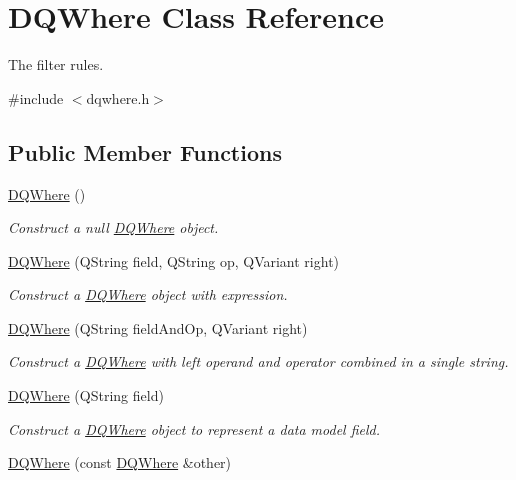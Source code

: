 \hypertarget{classDQWhere}{
\section{DQWhere Class Reference}
\label{classDQWhere}
}


The filter rules.  




{\ttfamily \#include $<$dqwhere.h$>$}

\subsection*{Public Member Functions}
\begin{DoxyCompactItemize}
\item 
\hyperlink{classDQWhere_a4e98841e0d93ed7c86df4da70d73c09b}{DQWhere} ()
\begin{DoxyCompactList}\small\item\em Construct a null \hyperlink{classDQWhere}{DQWhere} object. \item\end{DoxyCompactList}\item 
\hyperlink{classDQWhere_a630e2071891fc12e445f0bf3964be55b}{DQWhere} (QString field, QString op, QVariant right)
\begin{DoxyCompactList}\small\item\em Construct a \hyperlink{classDQWhere}{DQWhere} object with expression. \item\end{DoxyCompactList}\item 
\hyperlink{classDQWhere_a4f2e9d155ca1742cf1161ac822678389}{DQWhere} (QString fieldAndOp, QVariant right)
\begin{DoxyCompactList}\small\item\em Construct a \hyperlink{classDQWhere}{DQWhere} with left operand and operator combined in a single string. \item\end{DoxyCompactList}\item 
\hyperlink{classDQWhere_a27fba3a95249e8c39d7b7c07d2ba6aef}{DQWhere} (QString field)
\begin{DoxyCompactList}\small\item\em Construct a \hyperlink{classDQWhere}{DQWhere} object to represent a data model field. \item\end{DoxyCompactList}\item 
\hypertarget{classDQWhere_ad6a8f4727330a01fbab5d3547b3abf82}{
\hyperlink{classDQWhere_ad6a8f4727330a01fbab5d3547b3abf82}{DQWhere} (const \hyperlink{classDQWhere}{DQWhere} \&other)}
\label{classDQWhere_ad6a8f4727330a01fbab5d3547b3abf82}


\end{DoxyCompactItemize}

